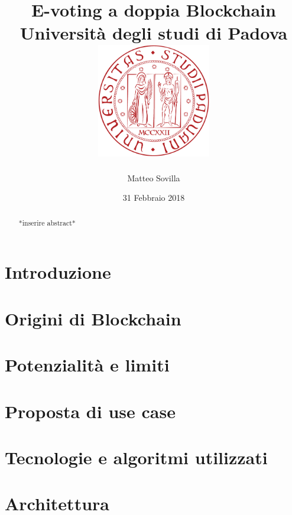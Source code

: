 \documentclass[12pt,twoside]{report}
\title{
	{E-voting a doppia Blockchain}\\
	{\large Università degli studi di Padova}\\
	{\includegraphics[width=5cm]{logo_unipd.eps}}
}
\author{Matteo Sovilla}
\date{31 Febbraio 2018}
\begin{document}


\begin{abstract}
*inserire abstract*

\end{abstract}



\tableofcontents
\listoffigures

\chapter{Introduzione}


\chapter{Origini di Blockchain}


\chapter{Potenzialità e limiti}


\chapter{Proposta di use case}


\chapter{Tecnologie e algoritmi utilizzati}


\chapter{Architettura}

\end{document}
